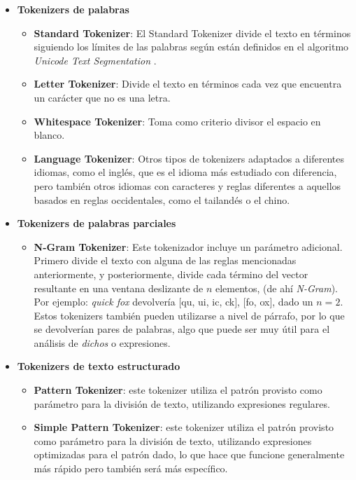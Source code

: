 \begin{itemize}
    
    \item \textbf{Tokenizers de palabras}
    \begin{itemize}
        \item \textbf{Standard Tokenizer}: El Standard Tokenizer divide el texto en términos siguiendo los límites de las palabras según están definidos en el algoritmo \textit{Unicode Text Segmentation} \cite{unicodeTextSegm}. 
        \item \textbf{Letter Tokenizer}: Divide el texto en términos cada vez que encuentra un carácter que no es una letra.
        \item \textbf{Whitespace Tokenizer}: Toma como criterio divisor el espacio en blanco.
        \item \textbf{Language Tokenizer}: Otros tipos de tokenizers adaptados a diferentes idiomas, como el inglés, que es el idioma más estudiado con diferencia, pero también otros idiomas con caracteres y reglas diferentes a aquellos basados en reglas occidentales, como el tailandés o el chino.
    \end{itemize}
    \item \textbf{Tokenizers de palabras parciales}
    \begin{itemize}
        \item \textbf{N-Gram Tokenizer}: Este tokenizador incluye un parámetro adicional. Primero divide el texto con alguna de las reglas mencionadas anteriormente, y posteriormente, divide cada término del vector resultante en una ventana deslizante de $n$ elementos, (de ahí \textit{N-Gram}). Por ejemplo: \textit{quick fox} devolvería $[$qu, ui, ic, ck$]$, $[$fo, ox$]$, dado un $n = 2$. Estos tokenizers también pueden utilizarse a nivel de párrafo, por lo que se devolverían pares de palabras, algo que puede ser muy útil para el análisis de \textit{dichos} o expresiones.
    \end{itemize}
    \item \textbf{Tokenizers de texto estructurado}
    \begin{itemize}
        \item \textbf{Pattern Tokenizer}: este tokenizer utiliza el patrón provisto como parámetro para la división de texto, utilizando expresiones regulares.
        \item \textbf{Simple Pattern Tokenizer}: este tokenizer utiliza el patrón provisto como parámetro para la división de texto, utilizando expresiones optimizadas para el patrón dado, lo que hace que funcione generalmente más rápido pero también será más específico.
    \end{itemize}
\end{itemize}

